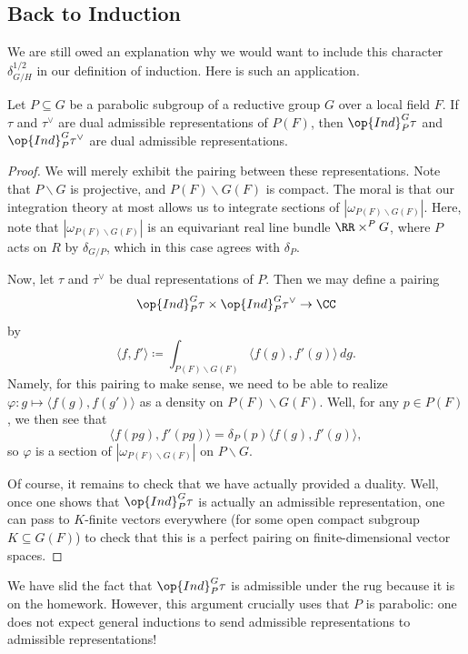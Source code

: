 \documentclass[../notes.tex]{subfiles}
\begin{document}
\subsection{Back to Induction}
We are still owed an explanation why we would want to include this character $\delta_{G/H}^{1/2}$ in our definition of induction. Here is such an application.
\begin{proposition}
	Let $P\subseteq G$ be a parabolic subgroup of a reductive group $G$ over a local field $F$. If $\tau$ and $\tau^\lor$ are dual admissible representations of $P(F)$, then $\op{Ind}_P^G\tau$ and $\op{Ind}_P^G\tau^\lor$ are dual admissible representations.
\end{proposition}
\begin{proof}
	We will merely exhibit the pairing between these representations. Note that $P\backslash G$ is projective, and $P(F)\backslash G(F)$ is compact. The moral is that our integration theory at most allows us to integrate sections of $\left|\omega_{P(F)\backslash G(F)}\right|$. Here, note that $\left|\omega_{P(F)\backslash G(F)}\right|$ is an equivariant real line bundle $\RR\times^PG$, where $P$ acts on $R$ by $\delta_{G/P}$, which in this case agrees with $\delta_P$.

	Now, let $\tau$ and $\tau^\lor$ be dual representations of $P$. Then we may define a pairing
	\[\op{Ind}_P^G\tau\times\op{Ind}_P^G\tau^\lor\to\CC\]
	by
	\[\langle f,f'\rangle\coloneqq\int_{P(F)\backslash G(F)}\langle f(g),f'(g)\rangle\,dg.\]
	Namely, for this pairing to make sense, we need to be able to realize $\varphi\colon g\mapsto\langle f(g),f(g')\rangle$ as a density on $P(F)\backslash G(F)$. Well, for any $p\in P(F)$, we then see that
	\[\langle f(pg),f'(pg)\rangle=\delta_P(p)\langle f(g),f'(g)\rangle,\]
	so $\varphi$ is a section of $\left|\omega_{P(F)\backslash G(F)}\right|$ on $P\backslash G$.

	Of course, it remains to check that we have actually provided a duality. Well, once one shows that $\op{Ind}_P^G\tau$ is actually an admissible representation, one can pass to $K$-finite vectors everywhere (for some open compact subgroup $K\subseteq G(F)$) to check that this is a perfect pairing on finite-dimensional vector spaces.
\end{proof}
\begin{remark}
	We have slid the fact that $\op{Ind}_P^G\tau$ is admissible under the rug because it is on the homework. However, this argument crucially uses that $P$ is parabolic: one does not expect general inductions to send admissible representations to admissible representations!
\end{remark}
\end{document}

